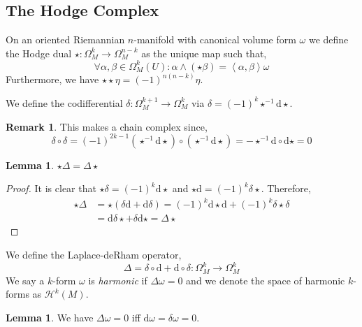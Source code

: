 \documentclass[12pt]{extarticle}
\renewcommand{\d}[1]{ \mathrm{d}#1 \:}
\theoremstyle{definition}
\newtheorem{lemma}[theorem]{Lemma}
\newtheorem{remark}{Remark}
\newenvironment{definition}[1][Definition:]{\begin{trivlist}
\item[\hskip \labelsep {\bfseries #1}]}{\end{trivlist}}
\newcommand{\inner}[2]{\left< #1, #2 \right>}
\begin{document}
\subsection{The Hodge Complex}

\newcommand{\Har}{\mathcal{H}}
\renewcommand{\d}{\mathrm{d}}

\begin{definition}
On an oriented Riemannian $n$-manifold with canonical volume form $\omega$ we define the Hodge dual $\star : \Omega^k_M \to \Omega^{n - k}_M$ as the unique map such that, \[ \forall \alpha, \beta \in \Omega^k_M(U) : \alpha \wedge (\star \beta) = \inner{\alpha}{\beta} \omega \]
Furthermore, we have $\star \star \eta = (-1)^{n(n-k)} \eta$. 
\end{definition}

\begin{definition}
We define the codifferential $\delta : \Omega^{k+1}_M \to \Omega^k_M$ via $\delta = (-1)^k \star^{-1} \d \star$. 
\end{definition}


\begin{remark}
This makes a chain complex since,
\[ \delta \circ \delta = (-1)^{2k - 1} (\star^{-1} \d \star) \circ (\star^{-1} \d \star) = - \star^{-1} \d \circ \d \star = 0 \]
\end{remark}

\begin{lemma}
$\star \Delta = \Delta \star$
\end{lemma}

\begin{proof}
It is clear that $\star \delta = (-1)^k \d \star$ and $\star \d = (-1)^k \delta \star$. Therefore,
\begin{align*}
\star \Delta & = \star (\delta \d + \d \delta ) = (-1)^k \d \star \d + (-1)^k \delta \star \delta 
\\
& = \d  \delta \star + \delta \d \star = \Delta \star 
\end{align*} 
\end{proof}

\begin{definition}
We define the Laplace-deRham operator,
\[ \Delta = \delta \circ \d{} + \d \circ \delta : \Omega^k_M \to \Omega^k_M \]
We say a $k$-form $\omega$ is \textit{harmonic} if $\Delta \omega = 0$ and we denote the space of harmonic $k$-forms as $\Har^k(M)$. 
\end{definition}

\begin{lemma}
We have $\Delta \omega = 0$ iff $\d{\omega} = \delta{\omega} = 0$.
\end{lemma}
\end{document}
